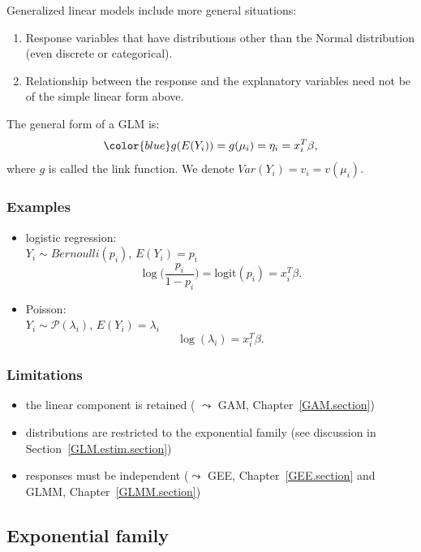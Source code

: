 \documentclass{beamer}
\begin{document}
\begin{frame}
Generalized linear models include more general situations:
\begin{enumerate}
\item Response variables that have distributions other than the Normal
  distribution (even discrete or categorical).
\item Relationship between the response and the explanatory variables
  need not be of the simple linear form above.
\end{enumerate}

The general form of a GLM is:
$${\color{blue}g(E(Y_i)) = g(\mu_i)=\eta_i=x_i^T \beta},$$
where $g$ is called the link function. We denote $Var(Y_i) = v_i = v(\mu_i)$.

\end{frame}


\begin{frame}
\frametitle{Examples}

\begin{itemize}
\item logistic regression:\\
 $Y_i \sim  Bernoulli(p_i)$, $E(Y_i) = p_i$
$$\log\Big(\frac{p_i}{1-p_i}\Big) = \mbox{logit}(p_i) = x_i^T \beta.$$
\item  Poisson:\\
$Y_i \sim {\mathcal P}(\lambda_i)$, $E(Y_i) = \lambda_i$
$$\log(\lambda_i) = x_i^T \beta.$$
\end{itemize}

\end{frame}

\begin{frame}
\frametitle{Limitations}

\begin{itemize}
\item the linear component is retained ( $\leadsto$ GAM, Chapter~\ref{GAM.section})
\item distributions are restricted to the exponential family (see discussion in
Section~\ref{GLM.estim.section})
\item responses must be independent ($\leadsto$ GEE, Chapter~\ref{GEE.section}
and GLMM, Chapter~\ref{GLMM.section})
\end{itemize}

\end{frame}

\subsection{Exponential family}
\end{document}
